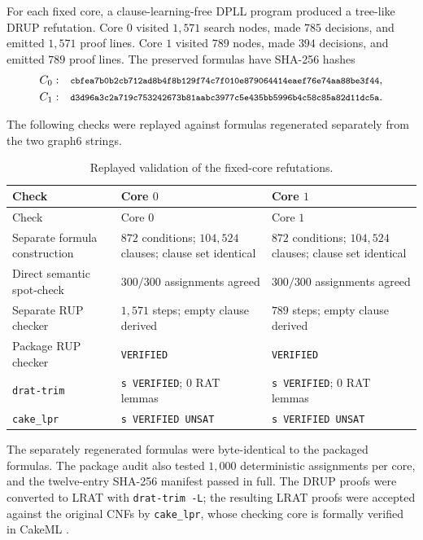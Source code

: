 \documentclass[11pt,a4paper]{article}
\theoremstyle{definition}
\theoremstyle{remark}
\newcommand{\sha}[1]{\texttt{\footnotesize #1}}
\begin{document}
For each fixed core, a clause-learning-free DPLL program produced a
tree-like DRUP refutation.  Core \(0\) visited \(1{,}571\) search nodes,
made \(785\) decisions, and emitted \(1{,}571\) proof lines.  Core \(1\)
visited \(789\) nodes, made \(394\) decisions, and emitted \(789\) proof
lines.  The preserved formulas have SHA-256 hashes
\[
\begin{array}{ll}
C_0:&
\sha{cbfea7b0b2cb712ad8b4f8b129f74c7f010e879064414eaef76e74aa88be3f44},\\[0.28em]
C_1:&
\sha{d3d96a3c2a719c753242673b81aabc3977c5e435bb5996b4c58c85a82d11dc5a}.
\end{array}
\]

The following checks were replayed against formulas regenerated
separately from the two graph6 strings.

\begin{longtable}{@{}>{\raggedright\arraybackslash}p{}
>{\raggedright\arraybackslash}p{}
>{\raggedright\arraybackslash}p{}@{}}
\caption{Replayed validation of the fixed-core refutations.}
\label{tab:verification}\\
\toprule
Check & Core \(0\) & Core \(1\)\\
\midrule
\endfirsthead
\toprule
Check & Core \(0\) & Core \(1\)\\
\midrule
\endhead
Separate formula construction &
\(872\) conditions; \(104{,}524\) clauses; clause set identical &
\(872\) conditions; \(104{,}524\) clauses; clause set identical\\
Direct semantic spot-check &
\(300/300\) assignments agreed &
\(300/300\) assignments agreed\\
Separate RUP checker &
\(1{,}571\) steps; empty clause derived &
\(789\) steps; empty clause derived\\
Package RUP checker &
\texttt{VERIFIED} &
\texttt{VERIFIED}\\
\texttt{drat-trim} \cite{drat-trim} &
\texttt{s VERIFIED}; \(0\) RAT lemmas &
\texttt{s VERIFIED}; \(0\) RAT lemmas\\
\texttt{cake\_lpr} \cite{cake-lpr} &
\texttt{s VERIFIED UNSAT} &
\texttt{s VERIFIED UNSAT}\\
\bottomrule
\end{longtable}

The separately regenerated formulas were byte-identical to the packaged
formulas.  The package audit also tested \(1{,}000\) deterministic
assignments per core, and the twelve-entry SHA-256 manifest passed in
full.  The DRUP proofs were converted to LRAT with
\texttt{drat-trim -L}; the resulting LRAT proofs were accepted against the
original CNFs by \texttt{cake\_lpr}, whose checking core is formally
verified in CakeML \cite{cake-lpr}.
\end{document}
